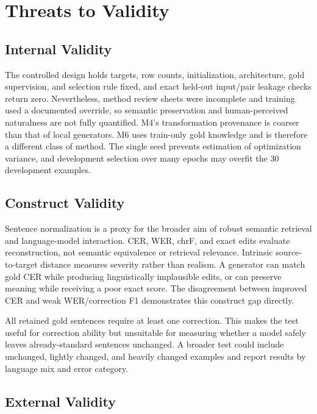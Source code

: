 \documentclass[12pt, a4paper, twoside, openany]{report}
\begin{document}
\section{Threats to Validity}

\subsection{Internal Validity}

The controlled design holds targets, row counts, initialization, architecture, gold supervision, and selection rule fixed, and exact held-out input/pair leakage checks return zero. Nevertheless, method review sheets were incomplete and training used a documented override, so semantic preservation and human-perceived naturalness are not fully quantified. M4's transformation provenance is coarser than that of local generators. M6 uses train-only gold knowledge and is therefore a different class of method. The single seed prevents estimation of optimization variance, and development selection over many epochs may overfit the 30 development examples.

\subsection{Construct Validity}

Sentence normalization is a proxy for the broader aim of robust semantic retrieval and language-model interaction. CER, WER, chrF, and exact edits evaluate reconstruction, not semantic equivalence or retrieval relevance. Intrinsic source-to-target distance measures severity rather than realism. A generator can match gold CER while producing linguistically implausible edits, or can preserve meaning while receiving a poor exact score. The disagreement between improved CER and weak WER/correction F1 demonstrates this construct gap directly.

All retained gold sentences require at least one correction. This makes the test useful for correction ability but unsuitable for measuring whether a model safely leaves already-standard sentences unchanged. A broader test could include unchanged, lightly changed, and heavily changed examples and report results by language mix and error category.

\subsection{External Validity}
\end{document}
